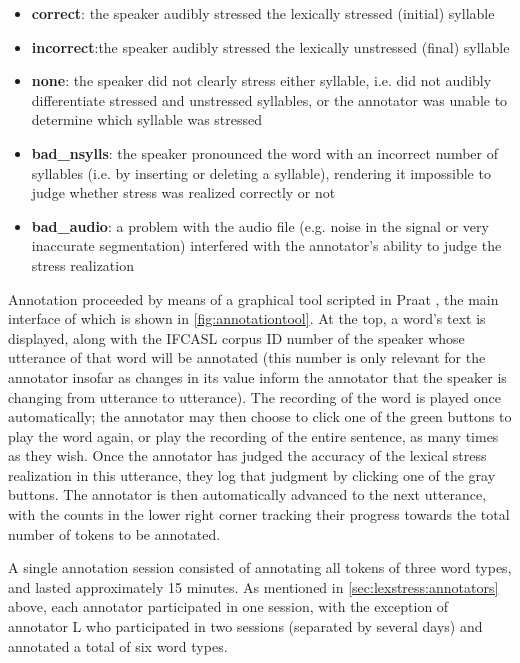 	\begin{itemize}
	\item{\textbf{correct}: the speaker audibly stressed the lexically stressed (initial) syllable}
	\item{\textbf{incorrect}:the speaker audibly stressed the lexically unstressed (final) syllable}
	\item{\textbf{none}: the speaker did not clearly stress either syllable, i.e. did not audibly differentiate stressed and unstressed syllables, or the annotator was unable to determine which syllable was stressed}
	\item{\textbf{bad\_nsylls}: the speaker pronounced the word with an incorrect number of syllables (i.e. by inserting or deleting a syllable), rendering it impossible to judge whether stress was realized correctly or not}
	\item{\textbf{bad\_audio}: a problem with the audio file (e.g. noise in the signal or very inaccurate segmentation) interfered with the annotator's ability to judge the stress realization}
	 \end{itemize}
	
	Annotation proceeded by means of a graphical tool scripted in Praat \parencite{Boersma2014}, the main interface of which is shown in \cref{fig:annotationtool}. At the top, a word's text is displayed, along with the IFCASL corpus ID number of the speaker whose utterance of that word will be annotated (this number is only relevant for the annotator insofar as changes in its value inform the annotator that the speaker is changing from utterance to utterance). The recording of the word
is played once automatically; the annotator may then choose to click one of the green buttons to play the word again, or play the recording of the entire sentence, as many times as they wish. Once the annotator has judged the accuracy of the lexical stress realization in this utterance, they log that judgment by clicking one of the gray buttons. The annotator is then automatically advanced to the next utterance, with the counts in the lower right corner tracking their progress towards the total number of tokens to be annotated. 

A single annotation session consisted of annotating all tokens of three word types, and lasted approximately 15 minutes. As mentioned in \cref{sec:lexstress:annotators} above, each annotator participated in one session, with the exception of annotator L who participated in two sessions (separated by several days) and annotated a total of six word types.
	
